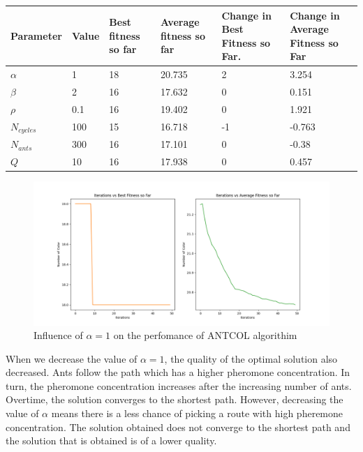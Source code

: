 \documentclass[a4paper]{article}
\begin{document}
\begin{center}
\begin{adjustbox}{width=1\textwidth}
\begin{tabular}{|l|l|l|l|l|l|}
\hline
Parameter & Value & Best fitness so far & Average fitness so far & Change in Best Fitness so Far. & Change in Average Fitness so Far \\ \hline
$\alpha$     & 1   & 18 & 20.735 & 2  & 3.254  \\ \hline
$\beta$      & 2   & 16 & 17.632 & 0  & 0.151  \\ \hline
$\rho$       & 0.1 & 16 & 19.402 & 0  & 1.921  \\ \hline
$N_{cycles}$ & 100 & 15 & 16.718 & -1 & -0.763 \\ \hline
$N_{ants}$   & 300 & 16 & 17.101 & 0  & -0.38  \\ \hline
$Q$          & 10  & 16 & 17.938 & 0  & 0.457  \\ \hline
\end{tabular}
\end{adjustbox}
\end{center}

\begin{center}
    \begin{figure}[h]
    \centering
    \includegraphics[width=12cm]{Figures/fig7.png}
    \caption{Influence of $\alpha = 1$ on the perfomance of ANTCOL algorithim}
    \end{figure}
\end{center}
When we decrease the value of $\alpha=1$, the quality of the optimal solution also decreased. Ants follow the path which has a higher pheromone concentration.
In turn, the pheromone concentration increases after the increasing number of ants. Overtime, the solution converges to the shortest path. However, 
decreasing the value of $\alpha$ means there is a less chance of picking a route with high pheremone concentration. The solution obtained does not converge to the shortest path 
and the solution that is obtained is of a lower quality.
\newpage
\end{document}
